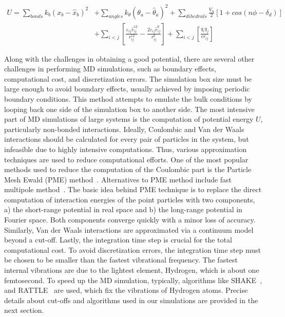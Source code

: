 \begin{equation}
\begin{split}
U = \sum_{bonds}k_b(x_b-\hat{x}_b)^2 
&+ \sum_{angles}k_{\theta}(\theta_a-\hat{\theta}_a)^2 + \sum_{dihedrals} \frac{V_n}{2}[1+cos(n\phi-\delta_d)] \\
&+\sum_{i<j} \left[\frac{\varepsilon_{ij}\hat{r}^{12}_{ij}}{r^{12}_{ij}}- \frac{2\varepsilon_{ij}\hat{r}^{6}_{ij}}{r^{6}_{ij}} \right] 
+\sum_{i<j} \left[\frac{q_iq_j}{\epsilon r_{ij}} \right]
\end{split}
\label{c3:eq3}
\end{equation}

Along with the challenges in obtaining a good potential,
there are several other challenges in performing MD
simulations, such as boundary effects, computational cost, and discretization errors. 
The simulation box size must be large enough to avoid boundary effects, usually achieved by imposing periodic boundary conditions. 
This method attempts to emulate the bulk conditions by looping back one side of the simulation box to another side. 
The most intensive part of MD simulations of large systems is the computation of potential energy $U$, particularly non-bonded interactions. 
Ideally, Coulombic and Van der Waals interactions should be calculated for every pair of particles in the system, but infeasible due to highly intensive computations.  
Thus, various approximation techniques are used to reduce computational efforts.
One of the most popular methods used to reduce the computation of the Coulombic part is the Particle Mesh Ewald (PME) method~\cite{pme}. Alternatives to PME method include fast multipole method~\cite{greengard1987fast}.
The basic idea behind PME technique is to replace the direct computation of interaction energies of the point particles with two components, a) the short-range potential in real space and b) the long-range potential in Fourier space.
Both components converge quickly with a minor loss of accuracy.
Similarly, Van der Waals interactions are approximated via a continuum model beyond a cut-off.   
Lastly, the integration time step is crucial for the total computational cost.
To avoid discretization errors, the integration time step must be chosen to be smaller than the fastest vibrational frequency.
The fastest internal vibrations are due to the lightest element, Hydrogen, which is about one femtosecond.
To speed up the MD simulation, typically, algorithms like SHAKE~\cite{shake}, and RATTLE~\cite{rattle} are used, which fix the vibrations of Hydrogen atoms. 
Precise details about cut-offs and algorithms used in our simulations are provided in the next section.

